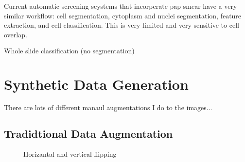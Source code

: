 \documentclass[ms,electronic,oneside,twosidetoc,letterpaper,chaptercenter,parttop]{byumsphd}
\begin{document}
Current automatic screening scystems that incorperate pap smear have a very similar workflow: 
cell segmentation, cytoplasm and nuclei segmentation, feature extraction, and cell classification.
This is very limited and very sensitive to cell overlap.

Whole slide classification (no segmentation) \cite{kiran}

\chapter{Synthetic Data Generation}

There are lots of different manaul augmentations I do to the images...

\section{Tradidtional Data Augmentation}

\begin{figure}[H]
  \centering
   \quad
   \quad
   \quad
   \quad
  \caption{Horizantal and vertical flipping}
\end{figure}
\end{document}
